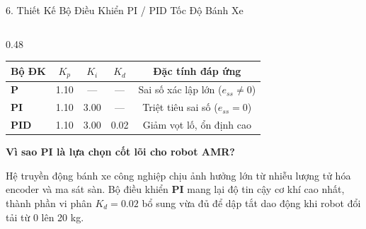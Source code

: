 \documentclass[aspectratio=169,9pt]{beamer}
\newcommand{\smallnote}[1]{{\fontsize{7.1}{8.4}\selectfont #1\par}}
\newcommand{\heading}[1]{{\bfseries\color{PTITRed} #1\par}}
\begin{document}
\begin{frame}{6. Thiết Kế Bộ Điều Khiển PI / PID Tốc Độ Bánh Xe}
\begin{columns}[T,onlytextwidth]
    \begin{column}{0.48\textwidth}
      \begin{tcolorbox}[titlepanel,title=Bảng tham số tinh chỉnh (Tuning Parameters)]
        {\fontsize{7.2}{8.5}\selectfont
        \begin{tabularx}{\linewidth}{@{}lcccc@{}}
          \toprule
          \textbf{Bộ ĐK} & \textbf{$K_p$} & \textbf{$K_i$} & \textbf{$K_d$} & \textbf{Đặc tính đáp ứng} \\
          \midrule
          \textbf{P} & 1.10 & --- & --- & Sai số xác lập lớn ($e_{ss} \neq 0$) \\
          \textbf{PI} & 1.10 & 3.00 & --- & Triệt tiêu sai số ($e_{ss} = 0$) \\
          \textbf{PID} & 1.10 & 3.00 & 0.02 & Giảm vọt lố, ổn định cao \\
          \bottomrule
        \end{tabularx}}
      \end{tcolorbox}
      \vspace{0.10cm}
      \begin{tcolorbox}[keypanel]
        \heading{Vì sao PI là lựa chọn cốt lõi cho robot AMR?}
        \smallnote{Hệ truyền động bánh xe công nghiệp chịu ảnh hưởng lớn từ nhiễu lượng tử hóa encoder và ma sát sàn. Bộ điều khiển \textbf{PI} mang lại độ tin cậy cơ khí cao nhất, thành phần vi phân $K_d = 0.02$ bổ sung vừa đủ để dập tắt dao động khi robot đổi tải từ 0 lên 20 kg.}
      \end{tcolorbox}
    \end{column}
  \end{columns}
\end{frame}
\end{document}
